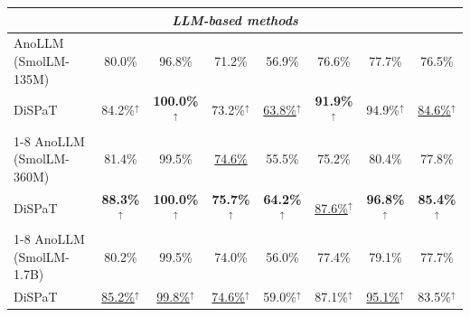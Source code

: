 \begin{table}[t]
\begin{tabular}{l c c c c c c c}
\midrule
\multicolumn{8}{c}{\textit{LLM-based methods}} \\
\midrule
AnoLLM (SmolLM-135M) & 80.0\% & 96.8\% & 71.2\% & 56.9\% & 76.6\% & 77.7\% & 76.5\% \\
DiSPaT               & 84.2\%$^{\uparrow}$ & \textbf{100.0\%}$^{\uparrow}$ & 73.2\%$^{\uparrow}$ & \underline{63.8\%}$^{\uparrow}$ & \textbf{91.9\%}$^{\uparrow}$ & 94.9\%$^{\uparrow}$ & \underline{84.6\%}$^{\uparrow}$ \\
\cmidrule{1-8}
AnoLLM (SmolLM-360M) & 81.4\% & 99.5\% & \underline{74.6\%} & 55.5\% & 75.2\% & 80.4\% & 77.8\% \\
DiSPaT               & \textbf{88.3\%}$^{\uparrow}$ & \textbf{100.0\%}$^{\uparrow}$ & \textbf{75.7\%}$^{\uparrow}$ & \textbf{64.2\%}$^{\uparrow}$ & \underline{87.6\%}$^{\uparrow}$ & \textbf{96.8\%}$^{\uparrow}$ & \textbf{85.4\%}$^{\uparrow}$ \\
\cmidrule{1-8}
AnoLLM (SmolLM-1.7B) & 80.2\% & 99.5\% & 74.0\% & 56.0\% & 77.4\% & 79.1\% & 77.7\% \\
DiSPaT               & \underline{85.2\%}$^{\uparrow}$ & \underline{99.8\%}$^{\uparrow}$ & \underline{74.6\%}$^{\uparrow}$ & 59.0\%$^{\uparrow}$ & 87.1\%$^{\uparrow}$ & \underline{95.1\%}$^{\uparrow}$ & 83.5\%$^{\uparrow}$ \\
\bottomrule
\end{tabular}
\end{table}


